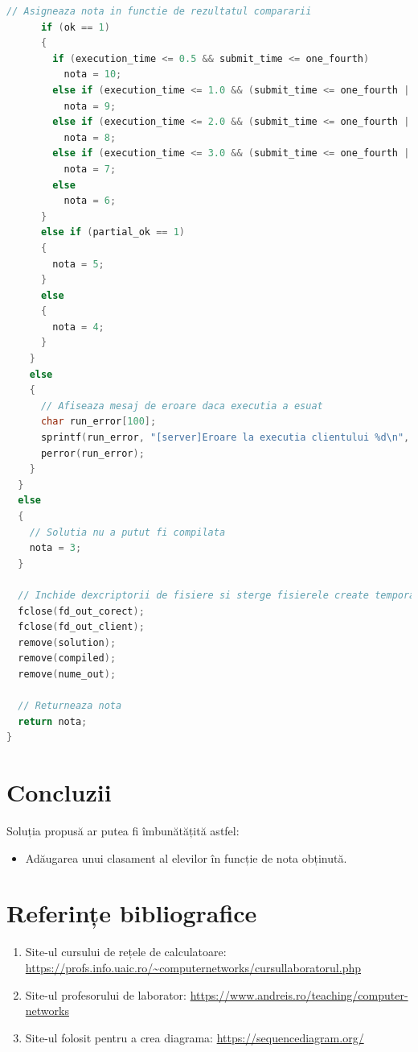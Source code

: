 \documentclass[runningheads]{llncs}
\begin{document}
\begin{lstlisting}[language=C, caption={Functia `corectare`}, label=corectare-function]
      // Asigneaza nota in functie de rezultatul compararii
      if (ok == 1)
      {
        if (execution_time <= 0.5 && submit_time <= one_fourth)
          nota = 10;
        else if (execution_time <= 1.0 && (submit_time <= one_fourth || submit_time <= two_fourths))
          nota = 9;
        else if (execution_time <= 2.0 && (submit_time <= one_fourth || submit_time <= two_fourths || submit_time <= three_fourths))
          nota = 8;
        else if (execution_time <= 3.0 && (submit_time <= one_fourth || submit_time <= two_fourths || submit_time <= three_fourths || submit_time <= four_fourths))
          nota = 7;
        else
          nota = 6;
      }
      else if (partial_ok == 1)
      {
        nota = 5;
      }
      else
      {
        nota = 4;
      }
    }
    else
    {
      // Afiseaza mesaj de eroare daca executia a esuat
      char run_error[100];
      sprintf(run_error, "[server]Eroare la executia clientului %d\n", contorclienti);
      perror(run_error);
    }
  }
  else
  {
    // Solutia nu a putut fi compilata
    nota = 3;
  }
      
  // Inchide dexcriptorii de fisiere si sterge fisierele create temporar
  fclose(fd_out_corect);
  fclose(fd_out_client);
  remove(solution);
  remove(compiled);
  remove(nume_out);
      
  // Returneaza nota
  return nota;
}
\end{lstlisting}
\section{Concluzii}
Soluția propusă ar putea fi îmbunătățită astfel:
\begin{itemize}
    \item Adăugarea unui clasament al elevilor în funcție de nota obținută.
\end{itemize}
\section{Referințe bibliografice}
\begin{enumerate}
    \item Site-ul cursului de rețele de calculatoare: \url{https://profs.info.uaic.ro/~computernetworks/cursullaboratorul.php}
    \item Site-ul profesorului de laborator: \url{https://www.andreis.ro/teaching/computer-networks}
    \item Site-ul folosit pentru a crea diagrama: \url{https://sequencediagram.org/}
\end{enumerate}
\end{document}
